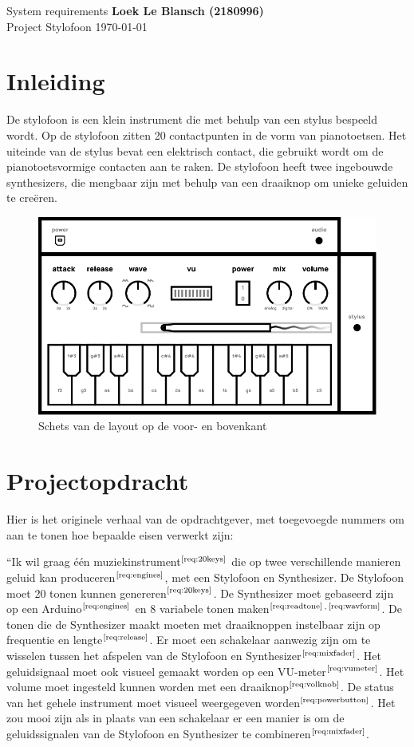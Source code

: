 \documentclass[12pt, a4paper, dutch]{article}
\newcommand{\req}[1]{$^{\text{\ref{req:#1}}}$}
\newcommand{\up}[1]{$^{\text{#1}}$}
\begin{document}
System requirements \hfill \textbf{Loek Le Blansch (2180996)}\\
Project Stylofoon \hfill \today
\medskip

\section{Inleiding}

De stylofoon is een klein instrument die met behulp van een stylus bespeeld wordt. Op
de stylofoon zitten 20 contactpunten in de vorm van pianotoetsen. Het uiteinde van de
stylus bevat een elektrisch contact, die gebruikt wordt om de pianotoetsvormige
contacten aan te raken. De stylofoon heeft twee ingebouwde synthesizers, die mengbaar
zijn met behulp van een draaiknop om unieke geluiden te cre\"eren.

\begin{figure}[H]
	\centering
	\includegraphics{figs/case-layout-sketch.pdf}
	\caption{Schets van de layout op de voor- en bovenkant}
\end{figure}

\section{Projectopdracht}

Hier is het originele verhaal van de opdrachtgever, met toegevoegde nummers om aan te
tonen hoe bepaalde eisen verwerkt zijn:

``Ik wil graag één muziekinstrument\req{20keys} die op twee verschillende manieren
geluid kan produceren\req{engines}, met een Stylofoon en Synthesizer. De Stylofoon
moet 20 tonen kunnen genereren\req{20keys}. De Synthesizer moet gebaseerd zijn op een
Arduino\req{engines} en 8 variabele tonen maken\req{readtone}\up{,}\req{wavform}. De
tonen die de Synthesizer maakt moeten met draaiknoppen instelbaar zijn op frequentie
en lengte\req{release}. Er moet een schakelaar aanwezig zijn om te wisselen tussen
het afspelen van de Stylofoon en Synthesizer\req{mixfader}. Het geluidsignaal moet
ook visueel gemaakt worden op een VU-meter\req{vumeter}. Het volume moet ingesteld
kunnen worden met een draaiknop\req{volknob}. De status van het gehele instrument
moet visueel weergegeven worden\req{powerbutton}. Het zou mooi zijn als in plaats van
een schakelaar er een manier is om de geluidssignalen van de Stylofoon en Synthesizer
te combineren\req{mixfader}.
\end{document}

